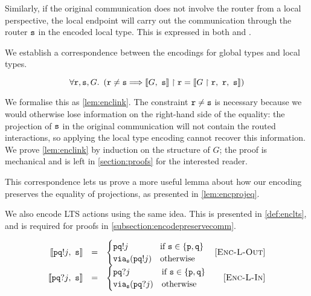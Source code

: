 Similarly, if the original communication does not involve
the router from a local perspective, the local endpoint
will carry out the communication through the router
$\texttt{s}$ in the encoded local type.
This is expressed in both 
and .

We establish a correspondence between the encodings for
global types and local types.

\[
\forall {\mathtt{r}}, {\mathtt{s}}, G. ~ \left(
{\mathtt{r}} \neq {\mathtt{s}} 
	\Longrightarrow
{ \llbracket {G},~ {\mathtt{s}}  \rrbracket } \upharpoonright {\mathtt{r}} = \llbracket { {G} \upharpoonright {\mathtt{r}}  },~{\mathtt{r}},~{\mathtt{s}} \rrbracket
\right)
\]

We formalise this as \cref{lem:enclink}.
The constraint ${\mathtt{r}} \neq {\mathtt{s}}$ is necessary
because we would otherwise lose information on the right-hand
side of the equality:
the projection of ${\mathtt{s}}$ in the original
communication will not contain the routed interactions,
so applying the local type encoding cannot recover this 
information.
We prove \cref{lem:enclink} by induction on the structure of $G$;
the proof is mechanical and is left in \cref{section:proofs}
for the interested reader.

This correspondence lets us prove a more useful 
lemma about how our encoding preserves the equality of projections,
as presented in \cref{lem:encprojeq}.

We also encode LTS actions using the same idea. 
This is presented in \cref{def:enclts}, and is required for
proofs in \cref{subsection:encodepreservecomm}.

\begin{definition}

\doublespacing
\[
\begin{array}{rclr}
\llbracket {  {\mathtt{p}}  {\mathtt{q}} !{j} },~{\mathtt{s}} \rrbracket &= & \begin{cases}
{\mathtt{p}}{\mathtt{q}}!{j}
	& \text{if } {\mathtt{s}} \in \{ {\mathtt{p}}, {\mathtt{q}} \} \\
{\texttt{via}_{{\mathtt{s}}}({{\mathtt{p}}{\mathtt{q}}!{j}})}
	& \text{otherwise} \\
\end{cases} & [\textsc{Enc-L-Out}] \\
\llbracket {  {\mathtt{p}}  {\mathtt{q}} ?{j} },~{\mathtt{s}} \rrbracket &= & \begin{cases}
{\mathtt{p}}{\mathtt{q}}?{j}
	& \text{if } {\mathtt{s}} \in \{ {\mathtt{p}}, {\mathtt{q}} \} \\
{\texttt{via}_{{\mathtt{s}}}({{\mathtt{p}}{\mathtt{q}}?{j}})}
	& \text{otherwise} \\
\end{cases} & [\textsc{Enc-L-In}] \\
\end{array}
\]
\singlespacing

\label{def:enclts}
\end{definition}

